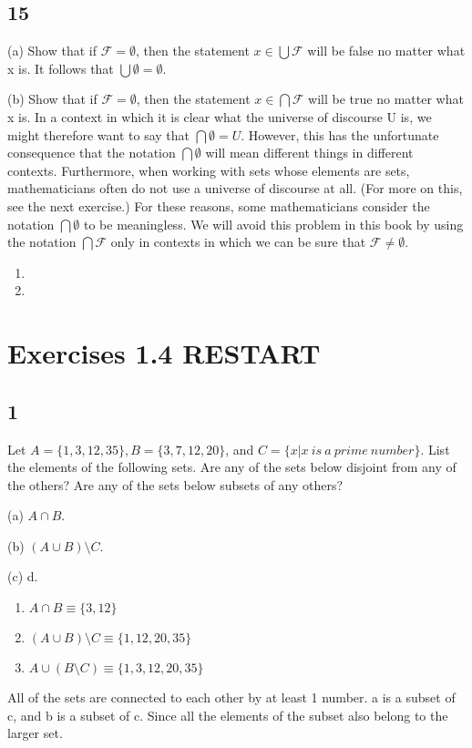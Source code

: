 \documentclass{article}
\begin{document}
\subsection{15}

(a) Show that if $\mathcal{F} = \emptyset$, then the statement $x \in \bigcup \mathcal{F}$ will be false no
matter what x is. It follows that $\bigcup\emptyset = \emptyset$.

(b) Show that if $\mathcal{F} = \emptyset$, then the statement $x \in \bigcap \mathcal{F}$ will be true no
matter what x is. In a context in which it is clear what the universe of
discourse U is, we might therefore want to say that $\bigcap \emptyset = U$.
However, this has the unfortunate consequence that the notation $\bigcap \emptyset$
will mean different things in different contexts. Furthermore, when
working with sets whose elements are sets, mathematicians often do
not use a universe of discourse at all. (For more on this, see the next
exercise.) For these reasons, some mathematicians consider the
notation $\bigcap \emptyset$ to be meaningless. We will avoid this problem in this
book by using the notation $\bigcap \mathcal{F}$ only in contexts in which we can be
sure that $\mathcal{F} \neq \emptyset$.
\begin{enumerate}[label=(\alph*)]
    \item
    \item
\end{enumerate}
 \section{Exercises 1.4 RESTART}
\subsection{1}
Let $A = \{1, 3, 12, 35\}, B = \{3, 7, 12, 20\}$, and $C = \{x \vert x \ is \ a \ prime \ number\}$. List the elements of the following sets. Are any of the sets below disjoint from any of the others? Are any of the sets below
subsets of any others?

(a) $A \cap B$.

(b) $(A \cup B) \setminus C$.

(c) d.

\begin{enumerate}[label=(\alph*)]
    \item
$A\cap B \equiv \{3,12\}$
    \item
$(A \cup B)\setminus C \equiv \{1,12,20,35 \}$
    \item
$A \cup (B \setminus C)\equiv \{1,3,12,20,35\}$
\end{enumerate}
All of the sets are connected to each other by at least 1 number. a is a subset of c, and b is a subset of c. Since all the elements of the subset also belong to the larger set.
\end{document}
